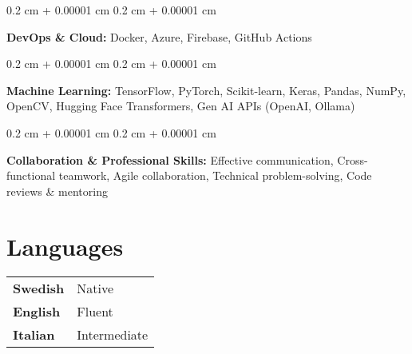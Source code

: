 \documentclass[10pt, letterpaper]{article}
\newenvironment{onecolentry}{
    \begin{adjustwidth}{
        0.2 cm + 0.00001 cm
    }{
        0.2 cm + 0.00001 cm
    }
}{
    \end{adjustwidth}
} %
\begin{document}
        \vspace{0.2 cm}

        \begin{onecolentry}
            \textbf{DevOps \& Cloud:} Docker, Azure, Firebase, GitHub Actions
        \end{onecolentry}

        \vspace{0.2 cm}

        \begin{onecolentry}
            \textbf{Machine Learning:} TensorFlow, PyTorch, Scikit-learn, Keras, Pandas, NumPy, OpenCV, Hugging Face Transformers, Gen AI APIs (OpenAI, Ollama)
        \end{onecolentry}

        \vspace{0.2 cm}

        \begin{onecolentry}
            \textbf{Collaboration \& Professional Skills:} Effective communication, Cross-functional teamwork, Agile collaboration, Technical problem-solving, Code reviews \& mentoring
        \end{onecolentry}

\section{Languages}
    \begin{tabular}{@{}ll}
        \textbf{Swedish} & Native \\
        \textbf{English} & Fluent \\
        \textbf{Italian} & Intermediate \\
    \end{tabular}
\end{document}
